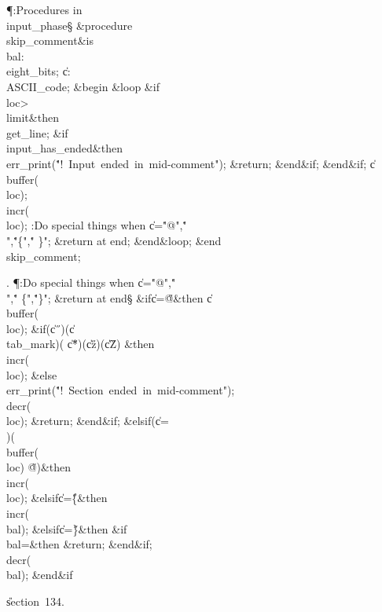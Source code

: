 \Y\P\?\4:Procedures in \\{input\_phase}\X\mathrel{+}\S\?\6
\&{procedure}\8\1\\{skip\_comment}\2\8\&{is}\8\1\6
\\{bal}\?:\?\\{eight\_bits}\?\K{};\6
\|c\?:\?\\{ASCII\_code};\6
\4\&{begin}\6
\1\&{loop}\6
\&{if}\1\1\8\\{loc}\?>\?\\{limit}\2\8\&{then}\6
\\{get\_line};\6
\&{if}\1\1\8\\{input\_has\_ended}\2\8\&{then}\6
\\{err\_print}\?\1(\?\.{"!\ Input\ ended\ in\ mid-comment"}\?\2)\?;\6
\&{return};\2\6
\&{end}\8\2\&{if}\1;\2\6
\&{end}\8\2\&{if}\1;\6
\|c\?\K\?\\{buffer}\?\1(\?\\{loc}\?\2)\?;\5
\\{incr}\?\1(\?\\{loc}\?\2)\?;\6
:Do special things when \|c\?=\?\.{"@"}\?,\?\.{"\\"}\?,\?\.{"\{"}\?,\?\.{"%
\}"}; \&{return} at end\X;\2\6
\&{end}\8\&{loop};\2\6
\&{end}\8\\{skip\_comment};\par
\fi

. \P\?:Do special things when \|c\?=\?\.{"@"}\?,\?\.{"\\"}\?,\?\.{"%
\{"}\?,\?\.{"\}"}; \&{return} at end\X\S\?\6
\&{if}\1\1\8\|c\?=\?\H{@}\2\8\&{then}\6
\|c\?\K\?\\{buffer}\?\1(\?\\{loc}\?\2)\?;\6
\&{if}\1\1\?\8\1(\?\|c\?\I\?\H{\ }\?\2)\W\1(\?\|c\?\I\?\\{tab\_mark}\?\2)\W\1(%
\?\|c\?\I\?\H{*}\?\2)\W\1(\?\|c\?\I\?\H{z}\?\2)\W\1(\?\|c\?\I\?\H{Z}\?\2)\?\2\8%
\&{then}\6
\\{incr}\?\1(\?\\{loc}\?\2)\?;\6
\4\&{else}\6
\\{err\_print}\?\1(\?\.{"!\ Section\ ended\ in\ mid-comment"}\?\2)\?;\6
\\{decr}\?\1(\?\\{loc}\?\2)\?;\5
\&{return};\2\6
\&{end}\8\2\&{if}\1;\6
\4\&{elsif}\1\?\8\1(\?\|c\?=\?\H{\\}\?\2)\W\1(\?\\{buffer}\?\1(\?\\{loc}\?\2)\I%
\?\H{@}\?\2)\?\2\8\&{then}\6
\\{incr}\?\1(\?\\{loc}\?\2)\?;\6
\4\&{elsif}\1\8\|c\?=\?\H{\{}\2\8\&{then}\6
\\{incr}\?\1(\?\\{bal}\?\2)\?;\6
\4\&{elsif}\1\8\|c\?=\?\H{\}}\2\8\&{then}\6
\&{if}\1\1\8\\{bal}\?=\2\8\&{then}\6
\&{return};\2\6
\&{end}\8\2\&{if}\1;\6
\\{decr}\?\1(\?\\{bal}\?\2)\?;\2\6
\&{end}\8\2\&{if}\1\par
\U section~134.\fi

